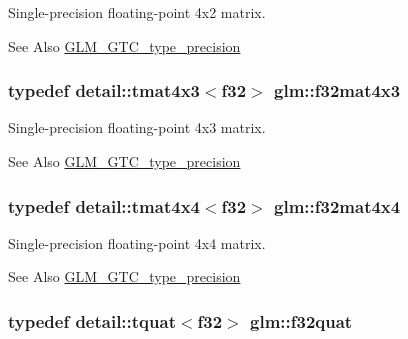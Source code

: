Single-\/precision floating-\/point 4x2 matrix. 

\begin{DoxySeeAlso}{See Also}
\hyperlink{group__gtc__type__precision}{G\-L\-M\-\_\-\-G\-T\-C\-\_\-type\-\_\-precision} 
\end{DoxySeeAlso}
\hypertarget{group__gtc__type__precision_ga0b80103fc9c41a559c616e3f84dc570f}{
\subsubsection[{f32mat4x3}]{\setlength{\rightskip}{0pt plus 5cm}typedef detail\-::tmat4x3$<$f32$>$ {\bf glm\-::f32mat4x3}}}\label{group__gtc__type__precision_ga0b80103fc9c41a559c616e3f84dc570f}


Single-\/precision floating-\/point 4x3 matrix. 

\begin{DoxySeeAlso}{See Also}
\hyperlink{group__gtc__type__precision}{G\-L\-M\-\_\-\-G\-T\-C\-\_\-type\-\_\-precision} 
\end{DoxySeeAlso}
\hypertarget{group__gtc__type__precision_gaffefd599ebe609080b8e999aa8df7f83}{
\subsubsection[{f32mat4x4}]{\setlength{\rightskip}{0pt plus 5cm}typedef detail\-::tmat4x4$<$f32$>$ {\bf glm\-::f32mat4x4}}}\label{group__gtc__type__precision_gaffefd599ebe609080b8e999aa8df7f83}


Single-\/precision floating-\/point 4x4 matrix. 

\begin{DoxySeeAlso}{See Also}
\hyperlink{group__gtc__type__precision}{G\-L\-M\-\_\-\-G\-T\-C\-\_\-type\-\_\-precision} 
\end{DoxySeeAlso}
\hypertarget{group__gtc__type__precision_ga7edc623b0da433e074936e732600766f}{
\subsubsection[{f32quat}]{\setlength{\rightskip}{0pt plus 5cm}typedef detail\-::tquat$<$f32$>$ {\bf glm\-::f32quat}}}\label{group__gtc__type__precision_ga7edc623b0da433e074936e732600766f}


